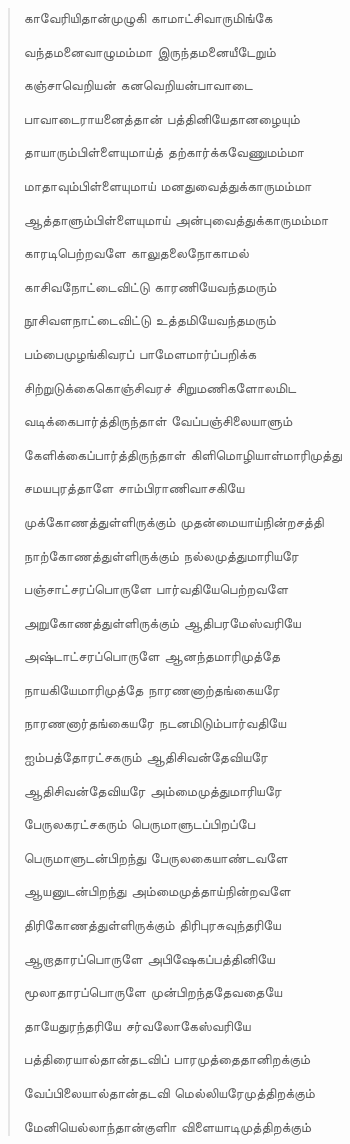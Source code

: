 \documentclass{article}
\begin{document}
\begin{quotation}
{காவேரியிதான்முழுகி காமாட்சிவாருமிங்கே

வந்தமனைவாழுமம்மா இருந்தமனையீடேறும்

கஞ்சாவெறியன் கனவெறியன்பாவாடை

பாவாடைராயனைத்தான் பத்தினியேதானழையும்

தாயாரும்பிள்ளையுமாய்த் தற்கார்க்கவேணுமம்மா

மாதாவும்பிள்ளையுமாய் மனதுவைத்துக்காருமம்மா

ஆத்தாளும்பிள்ளையுமாய் அன்புவைத்துக்காருமம்மா

காரடிபெற்றவளே காலுதலைநோகாமல்

காசிவநோட்டைவிட்டு காரணியேவந்தமரும்

நூசிவளநாட்டைவிட்டு உத்தமியேவந்தமரும்

பம்பைமுழங்கிவரப் பாமேளமார்ப்பறிக்க

சிற்றுடுக்கைகொஞ்சிவரச் சிறுமணிகளோலமிட

வடிக்கைபார்த்திருந்தாள் வேப்பஞ்சிலையாளும்

கேளிக்கைப்பார்த்திருந்தாள் கிளிமொழியாள்மாரிமுத்து

சமயபுரத்தாளே சாம்பிராணிவாசகியே

முக்கோணத்துள்ளிருக்கும் முதன்மையாய்நின்றசத்தி

நாற்கோணத்துள்ளிருக்கும் நல்லமுத்துமாரியரே

பஞ்சாட்சரப்பொருளே பார்வதியேபெற்றவளே

அறுகோணத்துள்ளிருக்கும் ஆதிபரமேஸ்வரியே

அஷ்டாட்சரப்பொருளே ஆனந்தமாரிமுத்தே

நாயகியேமாரிமுத்தே நாரணனாற்தங்கையரே

நாரணனார்தங்கையரே நடனமிடும்பார்வதியே

ஐம்பத்தோரட்சகரும் ஆதிசிவன்தேவியரே

ஆதிசிவன்தேவியரே அம்மைமுத்துமாரியரே

பேருலகரட்சகரும் பெருமாளுடப்பிறப்பே

பெருமாளுடன்பிறந்து பேருலகையாண்டவளே

ஆயனுடன்பிறந்து அம்மைமுத்தாய்நின்றவளே

திரிகோணத்துள்ளிருக்கும் திரிபுரசுவுந்தரியே

ஆறாதாரப்பொருளே அபிஷேகப்பத்தினியே

மூலாதாரப்பொருளே முன்பிறந்ததேவதையே

தாயேதுரந்தரியே சர்வலோகேஸ்வரியே

பத்திரையால்தான்தடவிப் பாரமுத்தைதானிறக்கும்

வேப்பிலையால்தான்தடவி மெல்லியரேமுத்திறக்கும்

மேனியெல்லாந்தான்குளிா விளையாடிமுத்திறக்கும்

}
\end{quotation}
\end{document}
